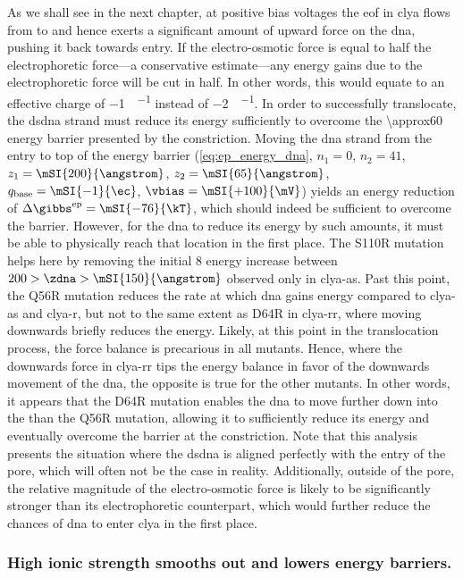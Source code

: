 As we shall see in the next chapter, at positive bias voltages the \gls{eof} in \gls{clya} flows from
\transi{} to \cisi{} and hence exerts a significant amount of upward force on the \gls{dna}, pushing it back
towards \cisi{} entry. If the electro-osmotic force is equal to half the electrophoretic force---a
conservative estimate---any energy gains due to the electrophoretic force will be cut in half. In other words,
this would equate to an effective charge of \SI{-1}{\ec\per\bp} instead of \SI{-2}{\ec\per\bp}. In order to
successfully translocate, the \gls{dsdna} strand must reduce its energy sufficiently to overcome the
\SI{\approx60}{\kT} energy barrier presented by the constriction.  Moving the \gls{dna} strand from the
\cisi{} entry to top of the energy barrier (\cref{eq:ep_energy_dna}, $n_1 = 0$, $n_2 = 41$, $z_1 =
\mSI{200}{\angstrom}$, $z_2 = \mSI{65}{\angstrom}$, $q_{\textrm{base}} = \mSI{-1}{\ec}$, $\vbias =
\mSI{+100}{\mV}$) yields an energy reduction of $\Delta \gibbs^{\textrm{ep}} = \mSI{-76}{\kT}$, which should
indeed be sufficient to overcome the barrier. However, for the \gls{dna} to reduce its energy by such amounts,
it must be able to physically reach that location in the first place. The S110R mutation helps here by
removing the initial \SI{+8}{\kT} energy increase between $200 > \zdna > \mSI{150}{\angstrom}$ observed only
in \gls{clya-as}. Past this point, the Q56R mutation reduces the rate at which \gls{dna} gains energy compared
to \gls{clya-as} and \gls{clya-r}, but not to the same extent as D64R in \gls{clya-rr}, where moving downwards
briefly reduces the energy. Likely, at this point in the translocation process, the force balance is
precarious in all mutants. Hence, where the downwards force in \gls{clya-rr} tips the energy balance in favor
of the downwards movement of the \gls{dna}, the opposite is true for the other mutants. In other words, it
appears that the D64R mutation enables the \gls{dna} to move further down into the \lumen{} than the Q56R
mutation, allowing it to sufficiently reduce its energy and eventually overcome the barrier at the
constriction. Note that this analysis presents the situation where the \gls{dsdna} is aligned perfectly with
the entry of the pore, which will often not be the case in reality. Additionally, outside of the pore, the
relative magnitude of the electro-osmotic force is likely to be significantly stronger than its
electrophoretic counterpart, which would further reduce the chances of \gls{dna} to enter \gls{clya} in the
first place.


\subsubsection{High ionic strength smooths out and lowers energy barriers.} 
%

